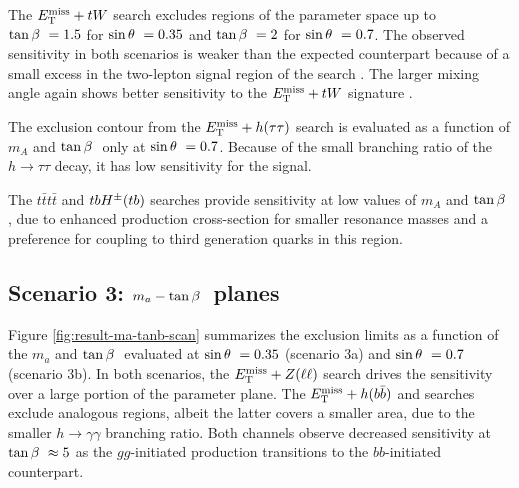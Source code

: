 The $E_{\mathrm{T}}^{\mathrm{miss}}+tW$ search excludes regions of the parameter space up to $\tan\beta~=1.5$ for $\sin\theta~=0.35$ and $\tan\beta~=2$ for $\sin\theta~=0.7$. The observed sensitivity in both scenarios is weaker than the expected counterpart because of a small excess in the two-lepton signal region of the search \cite{EXOT-2018-43}. The larger mixing angle again shows better sensitivity to the $E_{\mathrm{T}}^{\mathrm{miss}}+tW$ signature \cite{Pani:2017qyd}. 

The exclusion contour from the $E_{\mathrm{T}}^{\mathrm{miss}}+h(\tau\tau)$ search is evaluated as a function of $m_A$ and $\tan\beta~$ only at $\sin\theta~=0.7$. Because of the small branching ratio of the $h\rightarrow \tau\tau$ decay, it has low sensitivity for the \thdma signal. 

The $t\bar{t}t\bar{t}$ and $tbH^{\pm}(tb)$ searches provide sensitivity at low values of $m_A$ and $\tan\beta~$, due to enhanced production cross-section for smaller resonance masses and a preference for coupling to third generation quarks in this region.

\subsection{Scenario 3: \texorpdfstring{$m_a-\tan\beta~$}{TEXT} planes}

Figure \ref{fig:result-ma-tanb-scan} summarizes the exclusion limits as a function of the $m_a$ and $\tan\beta~$ evaluated at $\sin\theta~ = 0.35$ (scenario 3a) and $\sin\theta~ = 0.7$ (scenario 3b). In both scenarios, the $E_{\mathrm{T}}^{\mathrm{miss}}+Z(\ell\ell)$ search drives the sensitivity over a large portion of the parameter plane. The $E_{\mathrm{T}}^{\mathrm{miss}}+h(b\bar{b})$ and \monohgamgam searches exclude analogous regions, albeit the latter covers a smaller area, due to the smaller $h\rightarrow \gamma\gamma$ branching ratio. Both channels observe decreased sensitivity at $\tan\beta~\approx 5$ as the $gg$-initiated production transitions to the $bb$-initiated counterpart. 

